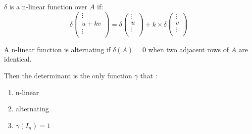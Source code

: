 \begin{definition}
    $\delta$ is a n-linear function over $A$ if:
    \begin{equation}
        \delta \begin{pmatrix}
            \vdots \\
            u + kv \\
            \vdots \\
        \end{pmatrix} = \delta \begin{pmatrix}
            \vdots \\
            u \\
            \vdots \\
        \end{pmatrix} + k \times \delta \begin{pmatrix}
            \vdots \\
            v \\
            \vdots \\
        \end{pmatrix} 
    \end{equation}
\end{definition}


\begin{definition}
    A n-linear function is alternating if $\delta (A) = 0$ when two adjacent rows of $A$ are identical.
\end{definition}

Then the determinant is the only function $\gamma$ that :
\begin{enumerate}
    \item n-linear
    \item alternating
    \item $\gamma(I_n) = 1$
\end{enumerate}


